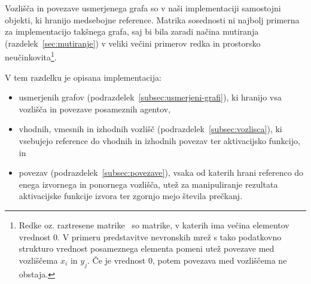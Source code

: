 \documentclass[a4paper,12pt,openright]{book}
\begin{document}
    Vozlišča in povezave usmerjenega grafa so v naši implementaciji samostojni objekti, ki hranijo medsebojne reference.
    Matrika sosednosti ni najbolj primerna za implementacijo takšnega grafa, saj bi bila zaradi načina mutiranja (razdelek~\ref{sec:mutiranje})
    v veliki večini primerov redka in prostorsko neučinkovita\footnote{Redke oz. raztresene matrike~\cite{enwiki:1196108633}
    so matrike, v katerih ima večina elementov vrednost 0.
    V primeru predstavitve nevronskih mrež s tako podatkovno strukturo vrednost posameznega elementa pomeni utež povezave
    med vozliščema $x_i$ in $y_j$.
    Če je vrednost 0, potem povezava med vozliščema ne obstaja.}.

    V tem razdelku je opisana implementacija:
    \begin{itemize}
        \item usmerjenih grafov (podrazdelek~\ref{subsec:usmerjeni-grafi}), ki hranijo vsa vozlišča in povezave posameznih agentov,
        \item vhodnih, vmesnih in izhodnih vozlišč (podrazdelek~\ref{subsec:vozlisca}), ki vsebujejo reference do vhodnih
        in izhodnih povezav ter aktivacijsko funkcijo, in
        \item povezav (podrazdelek~\ref{subsec:povezave}), vsaka od katerih hrani referenco do enega izvornega in
        ponornega vozlišča, utež za manipuliranje rezultata aktivacijske funkcije izvora ter zgornjo mejo števila prečkanj.
    \end{itemize}
\end{document}
